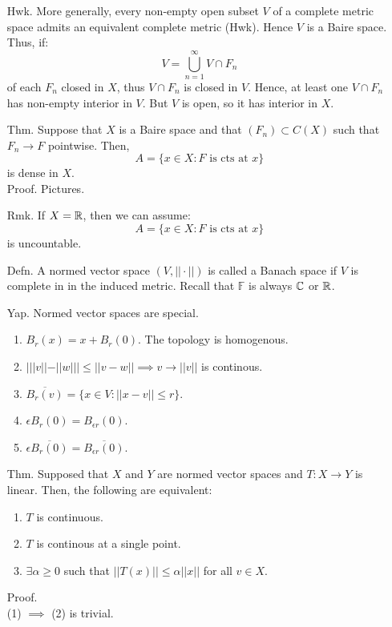 \documentclass[12pt]{article}
\begin{document}
\begin{itemize}
    \item[Hwk.] More generally, every non-empty open subset $V$ of a complete metric space admits an equivalent complete metric (Hwk). Hence $V$ is a Baire space. Thus, if:
    \[ V = \bigcup_{n=1}^\infty V \cap F_n \]
    of each $F_n$ closed in $X$, thus $V \cap F_n$ is closed in $V$. Hence, at least one $V \cap F_n$ has non-empty interior in $V$. But $V$ is open, so it has interior in $X$.
    \item[Thm.] Suppose that $X$ is a Baire space and that $(F_n) \subset C(X)$ such that $F_n \to F$ pointwise. Then,
    \[ A = \{x \in X : F \text{ is cts at $x$}\}\]
    is dense in $X$. \\
    Proof. Pictures. 
    \item[Rmk.] If $X = \mathbb R$, then we can assume: 
    \[ A = \{x \in X: F \text{ is cts at $x$}\}\]
    is uncountable. 
    \newpage
    \item[Defn.] A normed vector space $(V, ||\cdot||)$ is called a Banach space if $V$ is complete in in the induced metric. Recall that $\mathbb{F}$ is always $\mathbb C$ or $\mathbb R$.  
    \item[Yap.] Normed vector spaces are special. 
    \begin{enumerate}
        \item $B_r(x) = x + B_r(0)$. The topology is homogenous. 
        \item $| ||v|| - ||w|| | \leq ||v - w|| \implies v \to ||v||$ is continous.
        \item $\overline{B_r(v)} = \{x \in V : ||x-v|| \leq r\}$. 
        \item $\epsilon B_r(0) = B_{\epsilon r}(0)$. 
        \item $\epsilon \overline{B_r(0)} = \overline{B_{\epsilon r}(0)}$.
    \end{enumerate} 
    \item[Thm.] Supposed that $X$ and $Y$ are normed vector spaces and $T: X \to Y$ is linear. Then, the following are equivalent: 
    \begin{enumerate}
        \item $T$ is continuous.
        \item $T$ is continous at a single point.
        \item $\exists \alpha \geq 0$ such that $||T(x)|| \leq \alpha ||x||$ for all $v \in X$. 
    \end{enumerate}
    Proof. \\
    (1) $\implies$ (2) is trivial. \\

\end{itemize}
\end{document}
